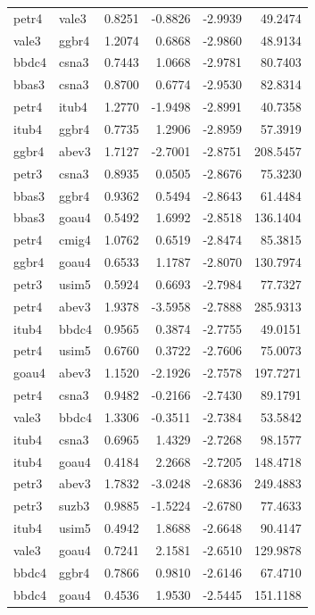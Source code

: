 \begin{tabular}{llrrrr}
petr4 & vale3 & 0.8251 & -0.8826 & -2.9939 & 49.2474\\
vale3 & ggbr4 & 1.2074 & 0.6868 & -2.9860 & 48.9134\\
bbdc4 & csna3 & 0.7443 & 1.0668 & -2.9781 & 80.7403\\
bbas3 & csna3 & 0.8700 & 0.6774 & -2.9530 & 82.8314\\
petr4 & itub4 & 1.2770 & -1.9498 & -2.8991 & 40.7358\\
\addlinespace
itub4 & ggbr4 & 0.7735 & 1.2906 & -2.8959 & 57.3919\\
ggbr4 & abev3 & 1.7127 & -2.7001 & -2.8751 & 208.5457\\
petr3 & csna3 & 0.8935 & 0.0505 & -2.8676 & 75.3230\\
bbas3 & ggbr4 & 0.9362 & 0.5494 & -2.8643 & 61.4484\\
bbas3 & goau4 & 0.5492 & 1.6992 & -2.8518 & 136.1404\\
\addlinespace
petr4 & cmig4 & 1.0762 & 0.6519 & -2.8474 & 85.3815\\
ggbr4 & goau4 & 0.6533 & 1.1787 & -2.8070 & 130.7974\\
petr3 & usim5 & 0.5924 & 0.6693 & -2.7984 & 77.7327\\
petr4 & abev3 & 1.9378 & -3.5958 & -2.7888 & 285.9313\\
itub4 & bbdc4 & 0.9565 & 0.3874 & -2.7755 & 49.0151\\
\addlinespace
petr4 & usim5 & 0.6760 & 0.3722 & -2.7606 & 75.0073\\
goau4 & abev3 & 1.1520 & -2.1926 & -2.7578 & 197.7271\\
petr4 & csna3 & 0.9482 & -0.2166 & -2.7430 & 89.1791\\
vale3 & bbdc4 & 1.3306 & -0.3511 & -2.7384 & 53.5842\\
itub4 & csna3 & 0.6965 & 1.4329 & -2.7268 & 98.1577\\
\addlinespace
itub4 & goau4 & 0.4184 & 2.2668 & -2.7205 & 148.4718\\
petr3 & abev3 & 1.7832 & -3.0248 & -2.6836 & 249.4883\\
petr3 & suzb3 & 0.9885 & -1.5224 & -2.6780 & 77.4633\\
itub4 & usim5 & 0.4942 & 1.8688 & -2.6648 & 90.4147\\
vale3 & goau4 & 0.7241 & 2.1581 & -2.6510 & 129.9878\\
\addlinespace
bbdc4 & ggbr4 & 0.7866 & 0.9810 & -2.6146 & 67.4710\\
bbdc4 & goau4 & 0.4536 & 1.9530 & -2.5445 & 151.1188\\

\end{tabular}
